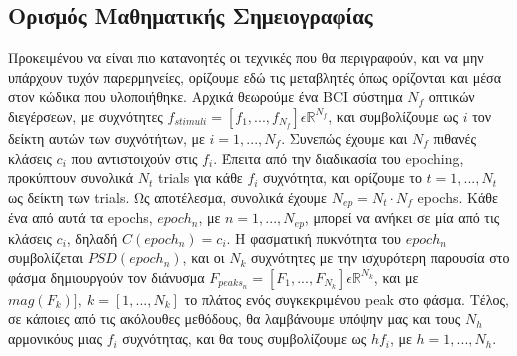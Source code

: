 \documentclass[11pt,a4paper,english,greek,twoside]{../Thesis}
\begin{document}
\subsection{Ορισμός Μαθηματικής Σημειογραφίας}
\par Προκειμένου να είναι πιο κατανοητές οι τεχνικές που θα περιγραφούν, και να μην υπάρχουν τυχόν παρερμηνείες, ορίζουμε εδώ τις μεταβλητές όπως ορίζονται και μέσα στον κώδικα που υλοποιήθηκε. Αρχικά θεωρούμε ένα BCI σύστημα $N_f$ οπτικών διεγέρσεων, με συχνότητες $f_{stimuli} = [f_1,...,f_{N_f}] \epsilon \mathbb{R}^{N_f}$, και συμβολίζουμε ως $i$ τον δείκτη αυτών των συχνότήτων, με $i = 1,...,N_f$. Συνεπώς έχουμε και $N_f$ πιθανές κλάσεις $c_i$ που αντιστοιχούν στις $f_i$. Έπειτα από την διαδικασία του epoching, προκύπτουν συνολικά $N_t$ trials για κάθε $f_i$ συχνότητα, και ορίζουμε το $t = 1,...,N_t$ ως δείκτη των trials. Ως αποτέλεσμα, συνολικά έχουμε $N_{ep} = N_t\cdot N_f$ epochs. Κάθε ένα από αυτά τα epochs, $epoch_n$, με $n=1,...,N_{ep}$, μπορεί να ανήκει σε μία από τις κλάσεις $c_i$, δηλαδή $C(epoch_n) = c_i$. Η φασματική πυκνότητα του $epoch_n$ συμβολίζεται $PSD(epoch_n)$, και οι $Ν_k$ συχνότητες με την ισχυρότερη παρουσία στο φάσμα δημιουργούν τον διάνυσμα $F_{peaks_{n}} = [F_1,...,F_{N_k}] \epsilon \mathbb{R}^{N_k}$, και με $mag(F_k)], \  k = [1,...,N_k]$ το πλάτος ενός συγκεκριμένου peak στο φάσμα. Τέλος, σε κάποιες από τις ακόλουθες μεθόδους, θα λαμβάνουμε υπόψην μας και τους $N_h$ αρμονικόυς μιας $f_i$ συχνότητας, και θα τους συμβολίζουμε ως $hf_i$, με $h=1,...,N_h$.
\end{document}
